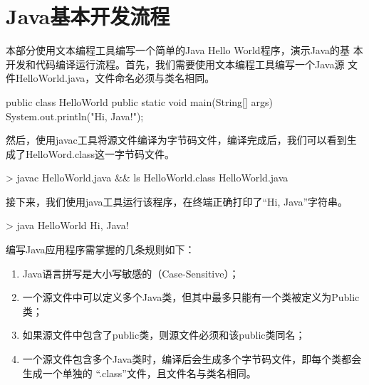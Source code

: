 \section{Java基本开发流程}

本部分使用文本编程工具编写一个简单的Java Hello World程序，演示Java的基
本开发和代码编译运行流程。首先，我们需要使用文本编程工具编写一个Java源
文件HelloWorld.java，文件命名必须与类名相同。

\begin{javaCode}
public class HelloWorld {
    public static void main(String[] args) {
	System.out.println("Hi, Java!");
    }
}   
\end{javaCode}

然后，使用javac工具将源文件编译为字节码文件，编译完成后，我们可以看到生成了HelloWord.class这一字节码文件。

\begin{shCode}
  > javac HelloWorld.java && ls 
  HelloWorld.class  HelloWorld.java
\end{shCode}

接下来，我们使用java工具运行该程序，在终端正确打印了“Hi, Java”字符串。

\begin{shCode}
  > java HelloWorld 
  Hi, Java!
\end{shCode}



编写Java应用程序需掌握的几条规则如下：

\begin{enumerate}
\item Java语言拼写是大小写敏感的（Case-Sensitive）；
\item 一个源文件中可以定义多个Java类，但其中最多只能有一个类被定义为Public类；
\item 如果源文件中包含了public类，则源文件必须和该public类同名；
\item 一个源文件包含多个Java类时，编译后会生成多个字节码文件，即每个类都会生成一个单独的
  “.class”文件，且文件名与类名相同。
\end{enumerate}

